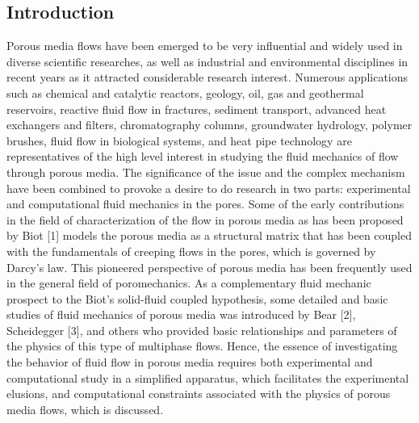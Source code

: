 \documentclass[letterpaper,12pt,titlepage,fleqn]{article}
\begin{document}
\begin{CJK}{UTF8}{gkai}
\section{Introduction}
Porous media flows have been emerged to be very influential and widely used in diverse scientific researches, as well as industrial and environmental disciplines in recent years as it attracted considerable research interest. Numerous applications such as chemical and catalytic reactors, geology, oil, gas and geothermal reservoirs, reactive fluid flow in fractures, sediment transport, advanced heat exchangers and filters, chromatography columns, groundwater hydrology, polymer brushes, fluid flow in biological systems, and heat pipe technology are representatives of the high level interest in studying the fluid mechanics of flow through porous media. The significance of the issue and the complex mechanism have been combined to provoke a desire to do research in two parts: experimental and computational fluid mechanics in the pores. 
Some of the early contributions in the field of characterization of the flow in porous media as has been proposed by Biot [1] models the porous media as a structural matrix that has been coupled with the fundamentals of creeping flows in the pores, which is governed by Darcy’s law. This pioneered perspective of porous media has been frequently used in the general field of poromechanics. As a complementary fluid mechanic prospect to the Biot’s solid-fluid coupled hypothesis, some detailed and basic studies of  fluid mechanics of porous media was introduced by Bear [2], Scheidegger [3], and others who provided basic relationships and parameters of the physics of this type of multiphase flows. Hence, the essence of investigating the behavior of fluid flow in porous media requires both experimental and computational study in a simplified apparatus, which facilitates the experimental elusions, and computational constraints associated with the physics of porous media flows, which is discussed.\\
\\

\end{CJK}
\end{document}
